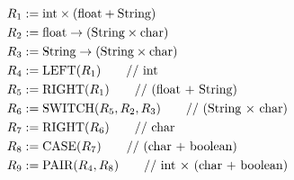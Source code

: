 \documentclass[11pt]{article}
\def\imp{\rightarrow}
\begin{document}
\subsection{} %
\begin{align*}
	R_1 &:= \text{int} \times (\text{float} + \text{String}) \\
	R_2 &:= \text{float} \imp (\text{String} \times \text{char}) \\
	R_3 &:= \text{String} \imp (\text{String} \times \text{char}) \\
	R_4 &:= \text{LEFT}(R_1) \tag*{// \text{int}} \\
	R_5 &:= \text{RIGHT}(R_1) \tag*{// (\text{float} + \text{String})} \\
	R_6 &:= \text{SWITCH}(R_5, R_2, R_3) \tag*{// (\text{String} $\times$ \text{char})} \\
	R_7 &:= \text{RIGHT}(R_6) \tag*{// char} \\
	R_8 &:= \text{CASE}(R_7) \tag*{// (char + boolean)} \\
	R_9 &:= \text{PAIR}(R_4, R_8) \tag*{// int $\times$ (char + boolean)} \\
\end{align*}
\end{document}
